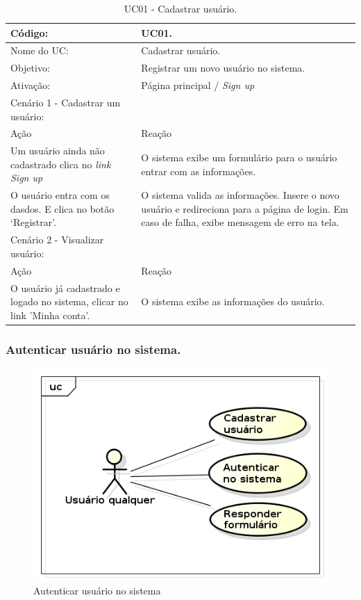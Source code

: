 \documentclass[11pt]{article}
\begin{document}
        \begin{table}[h]
          \begin{center}
            \begin{tabular}{ | p{7cm} | p{8cm} | }
              \hline
              Código: \cellcolor{gray} & UC01. \\
              \hline
              Nome do UC: \cellcolor{gray} & Cadastrar usuário. \\
              \hline
              Objetivo: \cellcolor{gray} & Registrar um novo usuário no sistema. \\
              \hline
              Ativação: \cellcolor{gray} & Página principal / \em Sign up \\
              \hline
              \hline
              Cenário 1 - Cadastrar um usuário: &  \\
              \hline
              Ação\cellcolor{gray} & Reação\cellcolor{gray} \\
              \hline
              Um usuário ainda não cadastrado clica no \em link Sign up & O sistema exibe um formulário para o usuário entrar com as informações. \\
              \hline
              O usuário entra com os dasdos. E clica no botão ‘Registrar’. & O sistema valida as informações. Insere o novo usuário e redireciona para a página de login. Em caso de falha, exibe mensagem de erro na tela. \\
              \hline
              \hline
              Cenário 2 - Visualizar usuário: &  \\
              \hline
              Ação\cellcolor{gray} & Reação\cellcolor{gray} \\
              \hline
              O usuário já cadastrado e logado no sistema, clicar no link 'Minha conta'. & O sistema exibe as informações do usuário. \\
              \hline
            \end{tabular}
            \caption{UC01 - Cadastrar usuário.}
          \end{center}
        \end{table}

    \clearpage

      \subsubsection{Autenticar usuário no sistema.}

        \begin{figure}[h!]
          \centering
          \includegraphics[width=.5\textwidth]{auth_create_user.png}
          \caption{Autenticar usuário no sistema}
        \end{figure}
\end{document}
